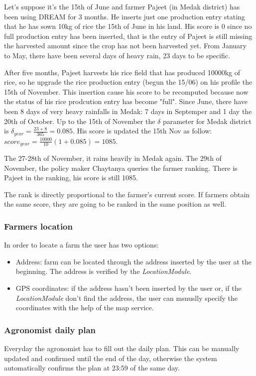 \documentclass[table, 12pt]{article}
\newcounter{testexample}
\begin{document}
\begin{testexample}
Let's suppose it's the 15th of June and farmer Pajeet (in Medak district) has been using DREAM for 3 months. He inserts just one production entry stating that he has sown 10kg of rice the 15th of June in his land. His score is 0 since no full production entry has been inserted, that is the entry of Pajeet is still missing the harvested amount since the crop has not been harvested yet. From January to May, there have been several days of heavy rain, 23 days to be specific.

After five months, Pajeet harvests his rice field that has produced 10000kg of rice, so he upgrade the rice production entry (begun the 15/06) on his profile the 15th of November. This insertion cause his score to be recomputed because now the status of his rice prodcution entry has become "full". Since June, there have been 8 days of very heavy rainfalls in Medak: 7 days in Septemper and 1 day the 20th of October. Up to the 15th of November the $\delta$ parameter for Medak district is $\delta_{year}=\frac{23+8}{365}=0.085$. His score is updated the 15th Nov as follow: $score_{year}=\frac{10000}{10}(1+0.085)=1085$.

The 27-28th of November, it rains heavily in Medak again. The 29th of November, the policy maker Chaytanya queries the farmer ranking. There is Pajeet in the ranking, his score is still 1085.
\end{testexample}

 The rank is directly proportional to the farmer's current score. If farmers obtain the same score, they are going to be ranked in the same position as well.

\subsubsection{Farmers location} In order to locate a farm the user has two options:
    \begin{itemize}
        \item Address: farm can be located through the address inserted by the user at the beginning.
        The address is verified by the \textit{LocationModule}.
        \item GPS coordinates: if the address hasn't been inserted by the user or, if the \textit{LocationModule} don't find the address, the user can msnuslly specify the coordinates with the help of the map service.
    \end{itemize}
\subsubsection{Agronomist daily plan} Everyday the agronomist has to fill out the daily plan.
This can be manually updated and confirmed until the end of the day, otherwise the system automatically confirms the plan at 23:59 of the same day.
\end{document}
